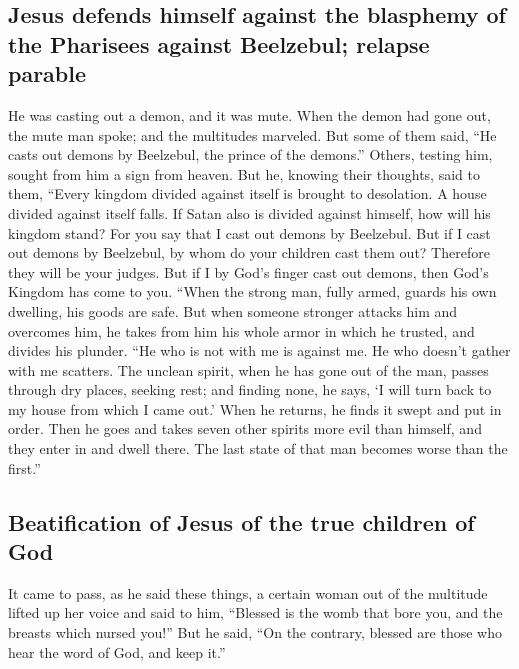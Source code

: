 \hypertarget{jesus-defends-himself-against-the-blasphemy-of-the-pharisees-against-beelzebul-relapse-parable}{%
\subsection{Jesus defends himself against the blasphemy of the Pharisees
against Beelzebul; relapse
parable}\label{jesus-defends-himself-against-the-blasphemy-of-the-pharisees-against-beelzebul-relapse-parable}}

 He was casting out a demon, and it was mute. When the
demon had gone out, the mute man spoke; and the multitudes marveled.
 But some of them said, ``He casts out demons by
Beelzebul, the prince of the demons.''  Others, testing
him, sought from him a sign from heaven.  But he, knowing
their thoughts, said to them, ``Every kingdom divided against itself is
brought to desolation. A house divided against itself falls.
 If Satan also is divided against himself, how will his
kingdom stand? For you say that I cast out demons by Beelzebul.
 But if I cast out demons by Beelzebul, by whom do your
children cast them out? Therefore they will be your judges.
 But if I by God's finger cast out demons, then God's
Kingdom has come to you.  ``When the strong man, fully
armed, guards his own dwelling, his goods are safe.  But
when someone stronger attacks him and overcomes him, he takes from him
his whole armor in which he trusted, and divides his plunder.
 ``He who is not with me is against me. He who doesn't
gather with me scatters.  The unclean spirit, when he has
gone out of the man, passes through dry places, seeking rest; and
finding none, he says, `I will turn back to my house from which I came
out.'  When he returns, he finds it swept and put in
order.  Then he goes and takes seven other spirits more
evil than himself, and they enter in and dwell there. The last state of
that man becomes worse than the first.''

\hypertarget{beatification-of-jesus-of-the-true-children-of-god}{%
\subsection{Beatification of Jesus of the true children of
God}\label{beatification-of-jesus-of-the-true-children-of-god}}

 It came to pass, as he said these things, a certain
woman out of the multitude lifted up her voice and said to him,
``Blessed is the womb that bore you, and the breasts which nursed you!''
 But he said, ``On the contrary, blessed are those who
hear the word of God, and keep it.''

